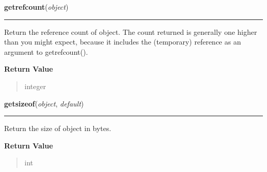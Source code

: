     \label{sys:getrefcount}

    \vspace{0.5ex}

\hspace{.8\funcindent}\begin{boxedminipage}{\funcwidth}

    \raggedright \textbf{getrefcount}(\textit{object})

    \vspace{-1.5ex}

    \rule{\textwidth}{0.5\fboxrule}
\setlength{\parskip}{2ex}
    Return the reference count of object.  The count returned is generally 
    one higher than you might expect, because it includes the (temporary) 
    reference as an argument to getrefcount().

\setlength{\parskip}{1ex}
      \textbf{Return Value}
    \vspace{-1ex}

      \begin{quote}
      integer

      \end{quote}

    \end{boxedminipage}

    \label{sys:getsizeof}

    \vspace{0.5ex}

\hspace{.8\funcindent}\begin{boxedminipage}{\funcwidth}

    \raggedright \textbf{getsizeof}(\textit{object}, \textit{default})

    \vspace{-1.5ex}

    \rule{\textwidth}{0.5\fboxrule}
\setlength{\parskip}{2ex}
    Return the size of object in bytes.

\setlength{\parskip}{1ex}
      \textbf{Return Value}
    \vspace{-1ex}

      \begin{quote}
      int

      \end{quote}

    \end{boxedminipage}

    \label{sys:gettrace}

